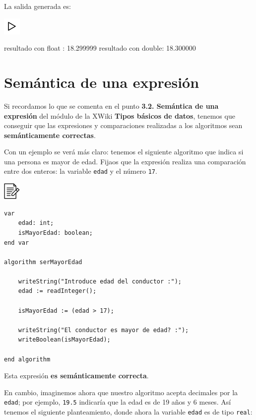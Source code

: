 \documentclass[
]{book}
\newenvironment{Shaded}{\begin{snugshade}}{\end{snugshade}}
\newcommand{\DataTypeTok}[1]{\textcolor[rgb]{0.13,0.29,0.53}{#1}}
\newcommand{\FloatTok}[1]{\textcolor[rgb]{0.00,0.00,0.81}{#1}}
\newcommand{\NormalTok}[1]{#1}
\begin{document}
La salida generada es:

\includegraphics{./img/play.png}

\begin{Shaded}
\begin{Highlighting}[]
\NormalTok{resultado con }\DataTypeTok{float}\NormalTok{ : }\FloatTok{18.299999}
\NormalTok{resultado con }\DataTypeTok{double}\NormalTok{: }\FloatTok{18.300000}
\end{Highlighting}
\end{Shaded}

\hypertarget{semuxe1ntica-de-una-expresiuxf3n}{%
\section{Semántica de una expresión}\label{semuxe1ntica-de-una-expresiuxf3n}}

Si recordamos lo que se comenta en el punto \textbf{3.2. Semántica de una expresión} del módulo de la XWiki \textbf{Tipos básicos de datos}, tenemos que conseguir que las expresiones y comparaciones realizadas a los algoritmos sean \textbf{semánticamente correctas}.

Con un ejemplo se verá más claro: tenemos el siguiente algoritmo que indica si una persona es mayor de edad. Fijaos que la expresión realiza una comparación entre dos enteros: la variable \texttt{edad} y el número \texttt{17}.

\includegraphics{./img/alg.png}

\begin{verbatim}
var
    edad: int;
    isMayorEdad: boolean;
end var

algorithm serMayorEdad

    writeString("Introduce edad del conductor :");
    edad := readInteger();

    isMayorEdad := (edad > 17);

    writeString("El conductor es mayor de edad? :");
    writeBoolean(isMayorEdad);

end algorithm
\end{verbatim}

Esta expresión \textbf{es semánticamente correcta}.

En cambio, imaginemos ahora que nuestro algoritmo acepta decimales por la \texttt{edad}; por ejemplo, \texttt{19.5} indicaría que la edad es de 19 años y 6 meses. Así tenemos el siguiente planteamiento, donde ahora la variable \texttt{edad} es de tipo \texttt{real}:
\end{document}
